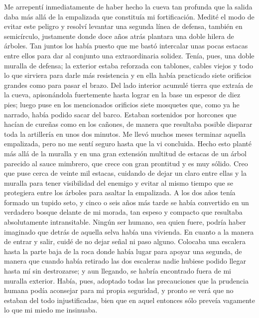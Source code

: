\documentclass{novela}
\begin{document}
    Me arrepentí inmediatamente de haber hecho la cueva tan profunda que la salida daba más allá de la empalizada que constituía mi fortificación. Medité el modo de evitar este peligro y resolví levantar una segunda línea de defensa, también en semicírculo, justamente donde doce años atrás plantara una doble hilera de árboles. Tan juntos los había puesto que me bastó intercalar unas pocas estacas entre ellos para dar al conjunto una extraordinaria solidez.
    Tenía, pues, una doble muralla de defensa; la exterior estaba reforzada con tablones, cables viejos y todo lo que sirviera para darle más resistencia y en ella había practicado siete orificios grandes como para pasar el brazo. Del lado interior acumulé tierra que extraía de la cueva, apisonándola fuertemente hasta lograr en la base un espesor de diez pies; luego puse en los mencionados orificios siete mosquetes que, como ya he narrado, había podido sacar del barco. Estaban sostenidos por horcones que hacían de cureñas como en los cañones, de manera que resultaba posible disparar toda la artillería en unos dos minutos. Me llevó muchos meses terminar aquella empalizada, pero no me sentí seguro hasta que la vi concluida.
    Hecho esto planté más allá de la muralla y en una gran extensión multitud de estacas de un árbol parecido al sauce mimbrero, que crece con gran prontitud y es muy sólido. Creo que puse cerca de veinte mil estacas, cuidando de dejar un claro entre ellas y la muralla para tener visibilidad del enemigo y evitar al mismo tiempo que se protegiera entre los árboles para asaltar la empalizada.
    A los dos años tenía formado un tupido seto, y cinco o seis años más tarde se había convertido en un verdadero bosque delante de mi morada, tan espeso y compacto que resultaba absolutamente intransitable. Ningún ser humano, sea quien fuere, podría haber imaginado que detrás de aquella selva había una vivienda. En cuanto a la manera de entrar y salir, cuidé de no dejar señal ni paso alguno. Colocaba una escalera hasta la parte baja de la roca donde había lugar para apoyar una segunda, de manera que cuando había retirado las dos escaleras nadie hubiese podido llegar hasta mí sin destrozarse; y aun llegando, se habría encontrado fuera de mi muralla exterior.
    Había, pues, adoptado todas las precauciones que la prudencia humana podía aconsejar para mi propia seguridad, y pronto se verá que no estaban del todo injustificadas, bien que en aquel entonces sólo preveía vagamente lo que mi miedo me insinuaba.
\end{document}
